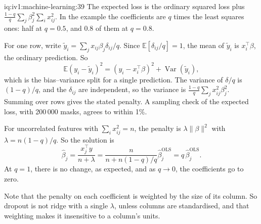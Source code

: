 \begin{solution}{iq:iv1:machine-learning:39}
The expected loss is the ordinary squared loss plus $\frac{1 - q}{q}\sum_j\beta_j^2\sum_ix_{ij}^2$. In the example the coefficients are $q$ times the least squares ones: half at $q = 0.5$, and $0.8$ of them at $q = 0.8$.

For one row, write $\tilde{y}_i = \sum_j x_{ij}\beta_j\delta_{ij}/q$. Since $\mathbb{E}[\delta_{ij}/q] = 1$, the mean of $\tilde{y}_i$ is $x_i^\top\beta$, the ordinary prediction. So
\[
\mathbb{E}(y_i - \tilde{y}_i)^2 = (y_i - x_i^\top\beta)^2 + \operatorname{Var}(\tilde{y}_i),
\]
which is the bias--variance split for a single prediction. The variance of $\delta/q$ is $(1 - q)/q$, and the $\delta_{ij}$ are independent, so the variance is $\frac{1 - q}{q}\sum_jx_{ij}^2\beta_j^2$. Summing over rows gives the stated penalty. A sampling check of the expected loss, with 200\,000 masks, agrees to within 1\%.

For uncorrelated features with $\sum_ix_{ij}^2 = n$, the penalty is $\lambda\|\beta\|^2$ with $\lambda = n(1 - q)/q$. So the solution is
\[
\hat{\beta}_j = \frac{x_j^\top y}{n + \lambda} = \frac{n}{n + n(1 - q)/q}\hat{\beta}^{\text{OLS}}_j = q\,\hat{\beta}^{\text{OLS}}_j.
\]
At $q = 1$, there is no change, as expected, and as $q \to 0$, the coefficients go to zero.

Note that the penalty on each coefficient is weighted by the size of its column. So dropout is not ridge with a single $\lambda$, unless columns are standardised, and that weighting makes it insensitive to a column's units.



\end{solution}

